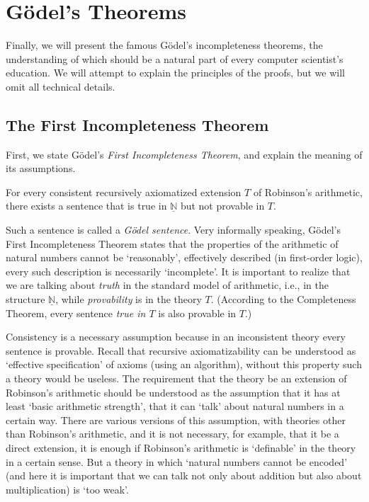     \section{Gödel's Theorems}
    
    Finally, we will present the famous Gödel's incompleteness theorems, the understanding of which should be a natural part of every computer scientist's education. We will attempt to explain the principles of the proofs, but we will omit all technical details.
    
    \subsection{The First Incompleteness Theorem}
    
    First, we state Gödel's \emph{First Incompleteness Theorem}, and explain the meaning of its assumptions.
    
    \begin{theorem}
    For every consistent recursively axiomatized extension $T$ of Robinson's arithmetic, there exists a sentence that is true in $\underline{\mathbb N}$ but not provable in $T$.    
    \end{theorem}
    
    Such a sentence is called a \emph{Gödel sentence}. Very informally speaking, Gödel's First Incompleteness Theorem states that the properties of the arithmetic of natural numbers cannot be `reasonably', effectively described (in first-order logic), every such description is necessarily `incomplete'. It is important to realize that we are talking about \emph{truth} in the standard model of arithmetic, i.e., in the structure $\underline{\mathbb N}$, while \emph{provability} is in the theory $T$. (According to the Completeness Theorem, every sentence \emph{true in $T$} is also provable in $T$.)
    
    Consistency is a necessary assumption because in an inconsistent theory every sentence is provable. Recall that recursive axiomatizability can be understood as `effective specification' of axioms (using an algorithm), without this property such a theory would be useless. The requirement that the theory be an extension of Robinson's arithmetic should be understood as the assumption that it has at least `basic arithmetic strength', that it can `talk' about natural numbers in a certain way. There are various versions of this assumption, with theories other than Robinson's arithmetic, and it is not necessary, for example, that it be a direct extension, it is enough if Robinson's arithmetic is `definable' in the theory in a certain sense. But a theory in which `natural numbers cannot be encoded' (and here it is important that we can talk not only about addition but also about multiplication) is `too weak'.
    
